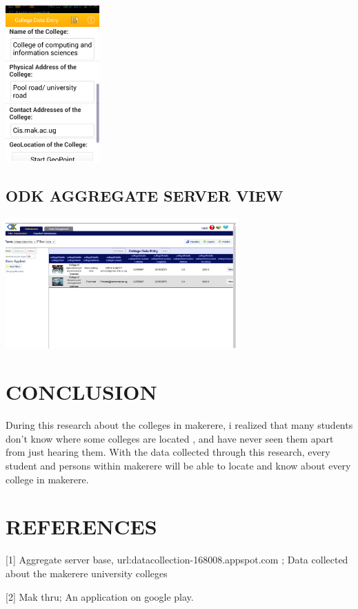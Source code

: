 \documentclass[12pt]{article}
\begin{document}
\includegraphics[width=0.3\linewidth, height=6cm]{datacollect1}



\subsection{ODK AGGREGATE SERVER VIEW }

\includegraphics[width=0.9\linewidth, height=5cm]{serverView}

\section{CONCLUSION}
During this research about the  colleges in makerere, i realized that many students don't know where some colleges are located , and have never seen them apart from just hearing them. With the data collected through this research, every student and persons within makerere will be able to locate and know about every college in makerere.

\section{REFERENCES}

[1] Aggregate server base, url:datacollection-168008.appspot.com ; Data collected about the makerere university colleges

[2] Mak thru; An application on google play. 
\end{document}
